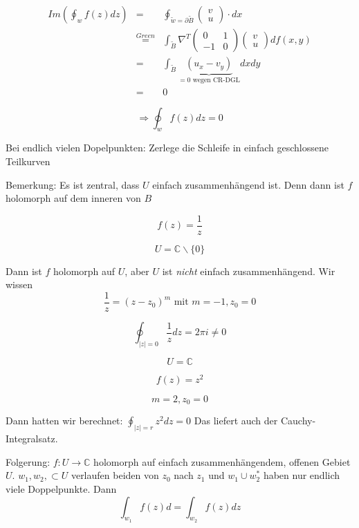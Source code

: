 \documentclass[10pt,a4paper]{article}
\begin{document}
\begin{eqnarray*}
Im\left(  \oint_{w} f(z) dz  \right) &=& \oint_{\tilde{w}=\partial \tilde{B}} \begin{pmatrix}
v \\ u
\end{pmatrix} \cdot dx  \\
&\stackrel{Green}{=}& \int_{\tilde{B}} \nabla^{T} \begin{pmatrix}
0 & 1 \\ -1 & 0
\end{pmatrix} \begin{pmatrix}
v \\u
\end{pmatrix} df(x,y) \\
&=& \int_{\tilde{B}} \underbrace{(u_x-v_y)}_{= 0 \text{ wegen CR-DGL}} dx dy \\
&=& 0
\end{eqnarray*}





$$\Rightarrow \oint_{w} f(z) dz =0$$

Bei endlich vielen Dopelpunkten: Zerlege die Schleife in einfach geschlossene Teilkurven

Bemerkung: Es ist zentral, dass $U$ einfach zusammenhängend ist. Denn dann ist $f$ holomorph auf dem inneren von $B$


\begin{bsp}

$$f(z)=\frac{1}{z}$$

$$U=\mathbb{C}\backslash \{0\}$$

Dann ist $f$ holomorph auf $U$, aber $U$ ist \emph{nicht} einfach zusammenhängend. Wir wissen $$\frac{1}{z}=(z-z_0)^{m} \text{ mit } m=-1, z_0=0$$

$$\oint_{|z|=0} \frac{1}{z} dz = 2 \pi i \not= 0$$
\end{bsp}



\begin{bsp}[Cachy-Integralsatz für $f(z)=z^{2}$]
$$U=\mathbb{C}$$

$$f(z)=z^{2}$$

$$m=2, z_0=0$$

Dann hatten wir berechnet: $\oint_{|z|=r} z^{2} dz = 0$ Das liefert auch der Cauchy-Integralsatz.
\end{bsp}

Folgerung: $f:U \rightarrow \mathbb{C}$ holomorph auf einfach zusammenhängendem, offenen Gebiet $U$. $w_1,w_2, \subset U$ verlaufen beiden von $z_0$ nach $z_1$ und $w_1 \cup w_2^{*}$ haben nur endlich viele Doppelpunkte. Dann $$\int_{w_1} f(z) d = \int_{w_2} f(z) dz$$
\end{document}
